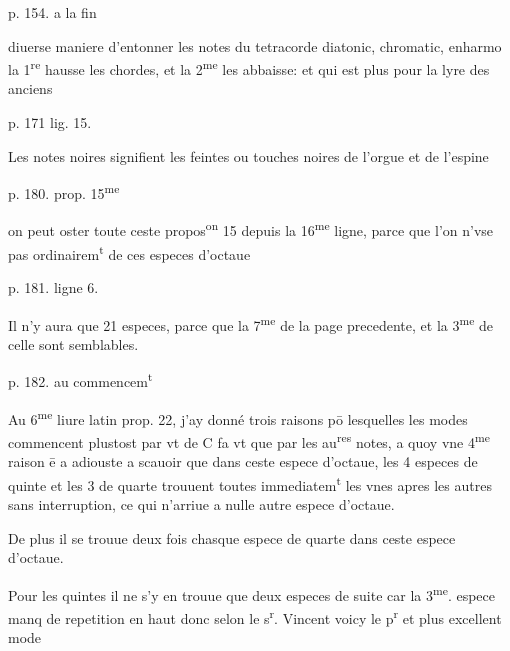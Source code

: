 \documentclass[11pt,a4paper]{article}
\begin{document}

p. 154. a la fin

diuerse maniere d'entonner les notes du tetracorde diatonic, chromatic, enharmo\ill{} la 1\textsuperscript{re} hausse les chordes, et la 2\textsuperscript{me} les abbaisse: et qui est plus pour la lyre des anciens

p. 171 lig. 15.

Les notes noires signifient les feintes ou touches noires de l'orgue et de l'espine\ill{}

p. 180. prop. 15\textsuperscript{me}

on peut oster toute ceste propos\textsuperscript{on} 15 depuis la 16\textsuperscript{me} ligne, parce que l'on n'vse pas ordinairem\textsuperscript{t} de ces especes d'octaue

p. 181. ligne 6.

Il n'y aura que 21 especes, parce que la 7\textsuperscript{me} de la page precedente, et la 3\textsuperscript{me} de celle\ill{} sont semblables.

p. 182. au commencem\textsuperscript{t}

Au 6\textsuperscript{me} liure latin prop. 22, j'ay donné trois raisons pō lesquelles les modes commencent plustost par vt de C fa vt que par les au\textsuperscript{res} notes, a quoy vne 4\textsuperscript{me} raison ē a adiouste\ill{} a scauoir que dans ceste espece d'octaue, les 4 especes de quinte et les 3 de quarte \ill{} trouuent toutes immediatem\textsuperscript{t} les vnes apres les autres sans interruption, ce qui n'arriue a nulle autre espece d'octaue.

De plus il se trouue deux fois chasque espece de quarte dans ceste espece d'octaue.

Pour les quintes il ne s'y en trouue que deux especes de suite car la 3\textsuperscript{me}. espece manq\ill{} de repetition en haut donc selon le s\textsuperscript{r}. Vincent voicy le p\textsuperscript{r} et plus excellent mode
\end{document}
